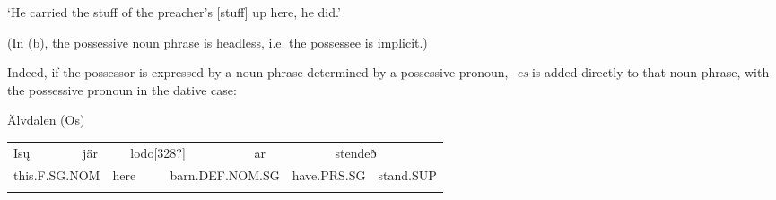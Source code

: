 \begin{styleTranslation}
‘He carried the stuff of the preacher’s [stuff] up here, he did.’

\end{styleTranslation}

\begin{styleBodyTextFirst}
(In (b), the possessive noun phrase is headless, i.e. the possessee is implicit.) 

\end{styleBodyTextFirst}

\begin{styleBodytextC}
Indeed, if the possessor is expressed by a noun phrase determined by a possessive pronoun,\textit{ -}\textit{es} is added directly to that noun phrase, with the possessive pronoun in the dative case:

\end{styleBodytextC}


\begin{listWWNumileveli}
\item {}

\begin{styleExample}
Älvdalen (Os)

\end{styleExample}

\end{listWWNumileveli}

\begin{listWWNumlxxviiileveli}
\item {}

\end{listWWNumlxxviiileveli}

\begin{tabular}{llllllllll}
\lsptoprule
Is\k{u} & \multicolumn{2}{l}{jär

} & \multicolumn{2}{l}{lodo[328?]

} & \multicolumn{2}{l}{ar

} & \multicolumn{2}{l}{stendeð

} & \\
\multicolumn{2}{l}{this.F.SG.NOM

} & \multicolumn{2}{l}{here

} & \multicolumn{2}{l}{barn.DEF.NOM.SG

} & \multicolumn{2}{l}{have.PRS.SG

} & \multicolumn{2}{l}{stand.SUP

}\\
\lspbottomrule
\end{tabular}

